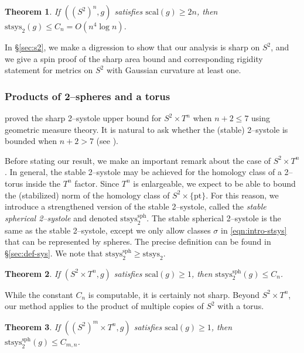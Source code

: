 \documentclass[12pt]{amsart}
\newtheorem{theorem}{Theorem}[section]
\theoremstyle{definition}
\numberwithin{equation}{section}
\begin{document}
\begin{theorem}\label{thm:s2n}
If $((S^2)^n, g)$ satisfies $\mathrm{scal}(g) \geq 2n$, then $\mathrm{stsys}_2(g) \leq C_n = O(n^4\log n)$.
\end{theorem}

In \S\ref{sec:s2}, we make a digression to show that our analysis is sharp on $S^2$, and we give a spin proof of the sharp area bound and corresponding rigidity statement for metrics on $S^2$ with Gaussian curvature at least one.


\subsubsection{Products of 2--spheres and a torus}\label{sec:txs2}
\cite{Zhu:txs2} proved the sharp 2--systole upper bound for $S^2 \times T^n$ when $n + 2 \leq 7$ using geometric measure theory. It is natural to ask whether the (stable) 2--systole is bounded when $n+2 > 7$ (see \cite[Conjecture 6.1]{Richard-Zhu:survey}).

Before stating our result, we make an important remark about the case of $S^2 \times T^n$. In general, the stable 2--systole may be achieved for the homology class of a 2--torus inside the $T^n$ factor. Since $T^n$ is enlargeable, we expect to be able to bound the (stabilized) norm of the homology class of $S^2 \times \{\mathrm{pt}\}$. For this reason, we introduce a strengthened version of the stable 2--systole, called the \emph{stable spherical 2--systole} and denoted $\mathrm{stsys}_2^{\mathrm{sph}}$. The stable spherical 2--systole is the same as the stable 2--systole, except we only allow classes $\sigma$ in \eqref{eqn:intro-stsys} that can be represented by spheres. The precise definition can be found in \S\ref{sec:def-sys}. We note that $\mathrm{stsys}_2^{\mathrm{sph}} \geq \mathrm{stsys}_2$.

\begin{theorem}\label{thm:txs2}
If $(S^2 \times T^n, g)$ satisfies $\mathrm{scal}(g) \geq 1$, then $\mathrm{stsys}_2^{\mathrm{sph}}(g) \leq C_n$.
\end{theorem}

While the constant $C_n$ is computable, it is certainly not sharp. Beyond $S^2 \times T^n$, our method applies to the product of multiple copies of $S^2$ with a torus.

\begin{theorem}\label{thm:txs2n}
If $((S^2)^m \times T^n, g)$ satisfies $\mathrm{scal}(g) \geq 1$, then $\mathrm{stsys}_2^{\mathrm{sph}}(g) \leq C_{m,n}$.
\end{theorem}
\end{document}

